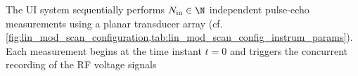 The \ac{UI} system sequentially performs
$N_{\text{in}} \in \N$ independent pulse-echo measurements using
a planar transducer array
(cf. \cref{fig:lin_mod_scan_configuration,tab:lin_mod_scan_config_instrum_params}).
Each measurement begins at
the time instant
$t = 0$ and triggers
the concurrent recording of
the \ac{RF} voltage signals
